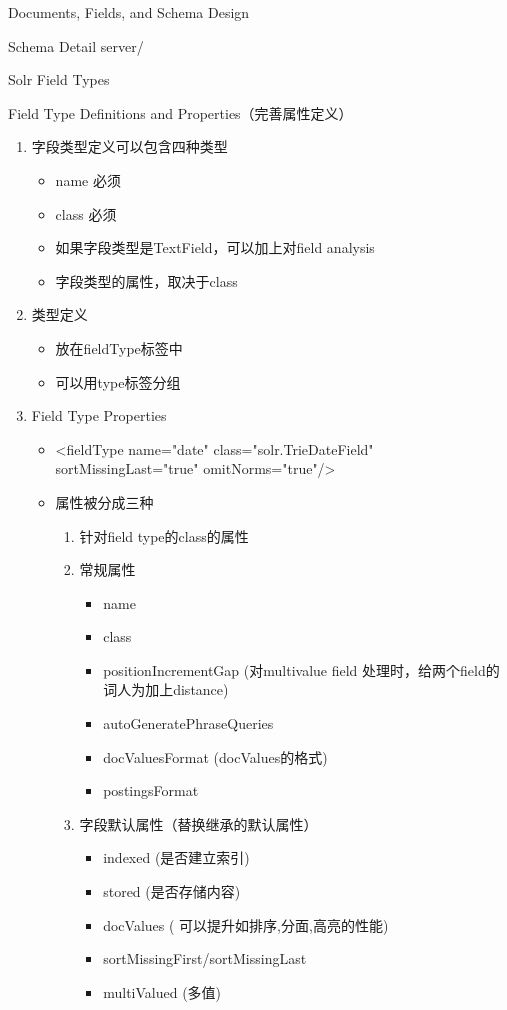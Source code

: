 \documentclass[presentation]{beamer}
\begin{document}
\begin{frame}[fragile,label={sec:orgc0e77e6}]{Documents, Fields, and Schema Design}
\begin{block}{Schema Detail}
server/
\begin{block}{Solr Field Types}
\begin{block}{Field Type Definitions and Properties（完善属性定义）}
\begin{enumerate}
\item 字段类型定义可以包含四种类型
\begin{itemize}
\item name 必须
\item class 必须
\item 如果字段类型是TextField，可以加上对field analysis
\item 字段类型的属性，取决于class
\end{itemize}
\item 类型定义
\begin{itemize}
\item 放在fieldType标签中
\item 可以用type标签分组
\end{itemize}
\item Field Type Properties
\begin{itemize}
\item <fieldType name="date" class="solr.TrieDateField" sortMissingLast="true" omitNorms="true"/>
\item 属性被分成三种
\begin{enumerate}
\item 针对field type的class的属性
\item 常规属性
\begin{itemize}
\item name
\item class
\item positionIncrementGap (对multivalue field 处理时，给两个field的词人为加上distance)
\item autoGeneratePhraseQueries
\item docValuesFormat (docValues的格式)
\item postingsFormat
\end{itemize}
\item 字段默认属性（替换继承的默认属性）
\begin{itemize}
\item indexed (是否建立索引)
\item stored (是否存储内容)
\item docValues ( 可以提升如排序,分面,高亮的性能)
\item sortMissingFirst/sortMissingLast
\item multiValued (多值)

\end{itemize}
\end{enumerate}
\end{itemize}
\end{enumerate}
\end{block}
\end{block}
\end{block}
\end{frame}
\end{document}
